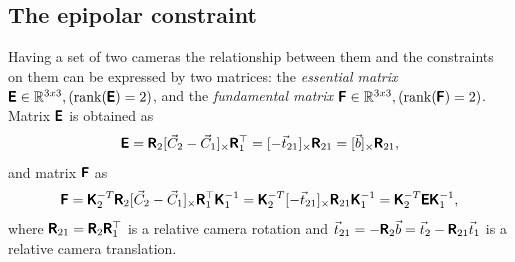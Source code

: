 \subsection{The epipolar constraint}
Having a set of two cameras the relationship between them and the constraints on them can be expressed by two matrices: the \textit{essential matrix} $\pmb{\mathsf{E}} \in \mathbb{R}^{3x3},(\operatorname{rank}(\pmb{\mathsf{E}}) = 2)$, and the \textit{fundamental matrix} $\pmb{\mathsf{F}} \in \mathbb{R}^{3x3}, (\operatorname{rank}(\pmb{\mathsf{F}}) = 2)$. Matrix $\pmb{\mathsf{E}}$ is obtained as
\begin{equation}
    \label{eq:E}
    \pmb{\mathsf{E}} = \pmb{\mathsf{R}}_2 [\vec{C}_2 - \vec{C}_1]_{\times} \pmb{\mathsf{R}}_1^\top = [-\vec{t}_{21}]_{\times} \pmb{\mathsf{R}}_{21} = [\vec{b}]_{\times} \pmb{\mathsf{R}}_{21},
\end{equation}
and matrix $\pmb{\mathsf{F}}$ as
\begin{equation}
    \label{eq:F}
    \pmb{\mathsf{F}} = \pmb{\mathsf{K}}_2^{-T} \pmb{\mathsf{R}}_2 [\vec{C}_2 - \vec{C}_1]_{\times} \pmb{\mathsf{R}}_1^\top \pmb{\mathsf{K}}_1^{-1} = 
    \pmb{\mathsf{K}}_2^{-T} [-\vec{t}_{21}]_{\times} \pmb{\mathsf{R}}_{21} \pmb{\mathsf{K}}_1^{-1} = 
    \pmb{\mathsf{K}}_2^{-T} \pmb{\mathsf{E}} \pmb{\mathsf{K}}_1^{-1},
\end{equation}
where 
$\pmb{\mathsf{R}}_{21} = \pmb{\mathsf{R}}_2 \pmb{\mathsf{R}}_1^\top$ is a relative camera rotation and 
$\vec{t}_{21} = -\pmb{\mathsf{R}}_2 \vec{b} = \vec{t}_2 - \pmb{\mathsf{R}}_{21}\vec{t}_1$ is a relative camera translation.

